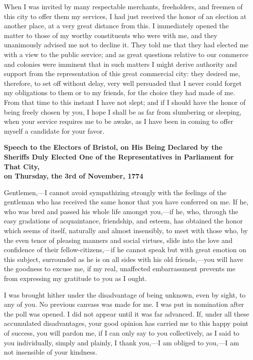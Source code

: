 When I was invited by many respectable merchants, freeholders, and freemen of this city to offer them my services, I had just received the honor of an election at another place, at a very great distance from this. I immediately opened the matter to those of my worthy constituents who were with me, and they unanimously advised me not to decline it. They told me that they had elected me with a view to the public service; and as great questions relative to our commerce and colonies were imminent that in such matters I might derive authority and support from the representation of this great commercial city: they desired me, therefore, to set off without delay, very well persuaded that I never could forget my obligations to them or to my friends, for the choice they had made of me. From that time to this instant I have not slept; and if I should have the honor of being freely chosen by you, I hope I shall be as far from slumbering or sleeping, when your service requires me to be awake, as I have been in coming to offer myself a candidate for your favor.


\begin{center}
  \textbf{{\large Speech to the Electors of Bristol, on His Being Declared
  by the Sheriffs Duly Elected One of the Representatives in Parliament
  for That City}, \\on Thursday, the 3rd of November, 1774}  \par 
\end{center}

Gentlemen,—I cannot avoid sympathizing strongly with the feelings of the gentleman who has received the same honor that you have conferred on me. If he, who was bred and passed his whole life amongst you,—if he, who, through the easy gradations of acquaintance, friendship, and esteem, has obtained the honor which seems of itself, naturally and almost insensibly, to meet with those who, by the even tenor of pleasing manners and social virtues, slide into the love and confidence of their fellow-citizens,—if he cannot speak but with great emotion on this subject, surrounded as he is on all sides with his old friends,—you will have the goodness to excuse me, if my real, unaffected embarrassment prevents me from expressing my gratitude to you as I ought.

I was brought hither under the disadvantage of being unknown, even by sight, to any of you. No previous canvass was made for me. I was put in nomination after the poll was opened. I did not appear until it was far advanced. If, under all these accumulated disadvantages, your good opinion has carried me to this happy point of success, you will pardon me, if I can only say to you collectively, as I said to you individually, simply and plainly, I thank you,—I am obliged to you,—I am not insensible of your kindness.

